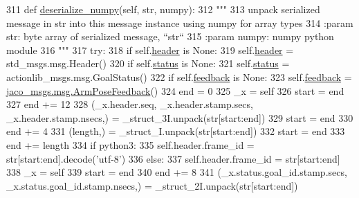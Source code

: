 \begin{DoxyCode}
311   \textcolor{keyword}{def }\hyperlink{classjaco__msgs_1_1msg_1_1__ArmPoseActionFeedback_1_1ArmPoseActionFeedback_ab18aa32ff74667c9f88c38ee0c6be58f}{deserialize\_numpy}(self, str, numpy):
312     \textcolor{stringliteral}{"""}
313 \textcolor{stringliteral}{    unpack serialized message in str into this message instance using numpy for array types}
314 \textcolor{stringliteral}{    :param str: byte array of serialized message, ``str``}
315 \textcolor{stringliteral}{    :param numpy: numpy python module}
316 \textcolor{stringliteral}{    """}
317     \textcolor{keywordflow}{try}:
318       \textcolor{keywordflow}{if} self.\hyperlink{classjaco__msgs_1_1msg_1_1__ArmPoseActionFeedback_1_1ArmPoseActionFeedback_a29a02efc077766aa6b97432487639dfe}{header} \textcolor{keywordflow}{is} \textcolor{keywordtype}{None}:
319         self.\hyperlink{classjaco__msgs_1_1msg_1_1__ArmPoseActionFeedback_1_1ArmPoseActionFeedback_a29a02efc077766aa6b97432487639dfe}{header} = std\_msgs.msg.Header()
320       \textcolor{keywordflow}{if} self.\hyperlink{classjaco__msgs_1_1msg_1_1__ArmPoseActionFeedback_1_1ArmPoseActionFeedback_a401e259f50e0f76aa3b79d712f3ef72c}{status} \textcolor{keywordflow}{is} \textcolor{keywordtype}{None}:
321         self.\hyperlink{classjaco__msgs_1_1msg_1_1__ArmPoseActionFeedback_1_1ArmPoseActionFeedback_a401e259f50e0f76aa3b79d712f3ef72c}{status} = actionlib\_msgs.msg.GoalStatus()
322       \textcolor{keywordflow}{if} self.\hyperlink{classjaco__msgs_1_1msg_1_1__ArmPoseActionFeedback_1_1ArmPoseActionFeedback_a3c9079d060107fb271e00b9cc073b42c}{feedback} \textcolor{keywordflow}{is} \textcolor{keywordtype}{None}:
323         self.\hyperlink{classjaco__msgs_1_1msg_1_1__ArmPoseActionFeedback_1_1ArmPoseActionFeedback_a3c9079d060107fb271e00b9cc073b42c}{feedback} = \hyperlink{classjaco__msgs_1_1msg_1_1__ArmPoseFeedback_1_1ArmPoseFeedback}{jaco\_msgs.msg.ArmPoseFeedback}()
324       end = 0
325       \_x = self
326       start = end
327       end += 12
328       (\_x.header.seq, \_x.header.stamp.secs, \_x.header.stamp.nsecs,) = \_struct\_3I.unpack(str[start:end])
329       start = end
330       end += 4
331       (length,) = \_struct\_I.unpack(str[start:end])
332       start = end
333       end += length
334       \textcolor{keywordflow}{if} python3:
335         self.header.frame\_id = str[start:end].decode(\textcolor{stringliteral}{'utf-8'})
336       \textcolor{keywordflow}{else}:
337         self.header.frame\_id = str[start:end]
338       \_x = self
339       start = end
340       end += 8
341       (\_x.status.goal\_id.stamp.secs, \_x.status.goal\_id.stamp.nsecs,) = \_struct\_2I.unpack(str[start:end])

\end{DoxyCode}
